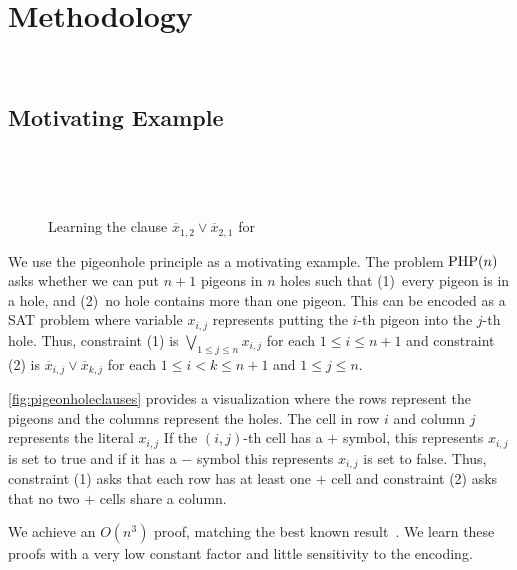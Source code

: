 \section{Methodology}~\label{sec:method}

\subsection{Motivating Example}~\label{sec:motivatex}

\begin{figure*}[!t]
    \centering
    
    \caption{Learning the clause $\overline{x}_{1, 2} \lor \overline{x}_{2, 1}$ for }~\label{fig:pigeonholeclauses}
  \end{figure*}

We use the pigeonhole principle as a motivating example.
The problem $\mathrm{PHP}(n)$ asks whether we can put $n+1$ pigeons in $n$ holes such
that (1)~every pigeon is in a hole, and (2)~no hole contains more than one
pigeon. This can be encoded as a SAT problem where variable $x_{i, j}$
represents putting the $i$-th pigeon into the $j$-th hole. Thus, constraint (1)
is $\bigvee_{1 \leq j \leq n} x_{i, j}$ for each $1 \leq i \leq n+1$ and
constraint (2) is $\overline{x}_{i, j} \lor \overline{x}_{k, j}$ for each $ 1
\leq i < k \leq n+1$ and $1 \leq j \leq n$.

\autoref{fig:pigeonholeclauses} provides a visualization where the
rows represent the pigeons and the columns represent the holes. The cell in row
$i$ and column $j$ represents the literal $x_{i, j}$
If the $(i, j)$-th cell has a $+$ symbol, this represents $x_{i, j}$ is set to
true and if it has a $-$ symbol this represents $x_{i, j}$ is set to false.
Thus, constraint (1) asks that each row has at least one $+$ cell and
constraint (2) asks that no two $+$ cells share a column.

We achieve an $O(n^3)$ \pr proof, matching the best known
result~\cite{prclauses}. We learn these proofs with a very low constant
factor and little sensitivity to the encoding.


